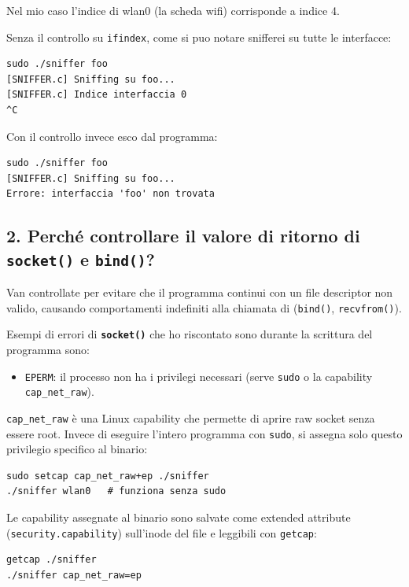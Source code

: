 \documentclass[a4paper,12pt]{article}
\begin{document}
Nel mio caso l'indice di wlan0 (la scheda wifi) corrisponde a indice 4.

Senza il controllo su \texttt{ifindex}, come si puo notare snifferei su tutte le 
interfacce:

\begin{lstlisting}[language={}]
sudo ./sniffer foo
[SNIFFER.c] Sniffing su foo...
[SNIFFER.c] Indice interfaccia 0
^C
\end{lstlisting}

Con il controllo invece esco dal programma:

\begin{lstlisting}[language={}]
sudo ./sniffer foo
[SNIFFER.c] Sniffing su foo...
Errore: interfaccia 'foo' non trovata
\end{lstlisting}

\subsection{2. Perché controllare il valore di ritorno di \texttt{socket()} e \texttt{bind()}?}

Van controllate per evitare che il programma continui con un file descriptor 
non valido, causando comportamenti indefiniti alla chiamata di
(\texttt{bind()}, \texttt{recvfrom()}).

Esempi di errori di \textbf{\texttt{socket()}} che ho riscontato sono durante
la scrittura del programma sono:

\begin{itemize}
  \item \texttt{EPERM}: il processo non ha i privilegi necessari (serve \texttt{sudo} o
        la capability \texttt{cap\_net\_raw}).
\end{itemize}

\texttt{cap\_net\_raw} è una Linux capability che permette di aprire raw socket senza
essere root. Invece di eseguire l'intero programma con \texttt{sudo}, si assegna solo
questo privilegio specifico al binario:

\begin{lstlisting}[language={}, caption={Assegnare cap\_net\_raw al binario}]
sudo setcap cap_net_raw+ep ./sniffer
./sniffer wlan0   # funziona senza sudo
\end{lstlisting}

Le capability assegnate al binario sono salvate come extended attribute
(\texttt{security.capability}) sull'inode del file e leggibili con \texttt{getcap}:

\begin{lstlisting}[language={}, caption={Lettura capability con getcap}]
getcap ./sniffer
./sniffer cap_net_raw=ep
\end{lstlisting}
\end{document}
